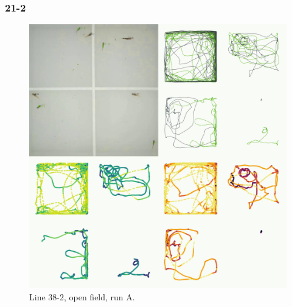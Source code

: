 \documentclass[
]{book}
\begin{document}
\hypertarget{section-4}{%
\subsubsection{21-2}\label{section-4}}



\begin{figure}
\includegraphics[width=1\linewidth]{figs/mikk_behaviour/four_panel_plots/open_field_20191113_1527_21-2_L_A_300} \caption{Line 38-2, open field, run A.}\label{fig:4p-21-2-of-A}
\end{figure}
\end{document}

